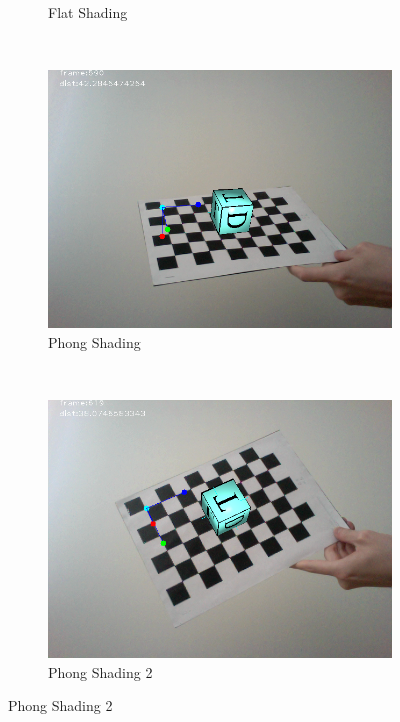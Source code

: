 \begin{figure}[h!]
\begin{subfigure}[b]{0.5\textwidth}
		\caption{Flat Shading}
		\label{subfig:flatshading}
	\end{subfigure}
	~
	\begin{subfigure}[b]{0.5\textwidth}
		\includegraphics[width=\textwidth]{final/images/phong1.png}
		\caption{Phong Shading}
		\label{subfig:phongshading}
	\end{subfigure}
	~
	\begin{subfigure}[b]{0.5\textwidth}
		\includegraphics[width=\textwidth]{final/images/phong2.png}
		\caption{Phong Shading 2}
		\label{subfig:phongshading2}
	\end{subfigure}
\end{figure}

